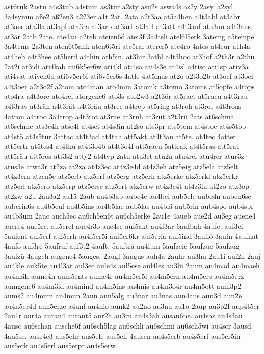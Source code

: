 {ast6ruk
2astu
a4s3tub
a4stum
as3tür
a2sty
asu2s
aswa4s
as2y
2asy.
a2syl
3a4symm
aße2
aß2en3
a2ß3er
a1t
2at.
2ata
a2t3aa
at5a4ben
a4t3abl
at3abr
at3aer
ata3la
at3apf
ata3ra
at3arb
at3art
at3atl
at3att
a4t3auf
ata3un
a4t3aus
at3är
2atb
2ate.
ate4au
a2teb
ateien6d
atei3f
3a4teli
atel6l5erk
3atemg
a5tempe
3a4tems
2a3ten
aten6t5ank
aten6t5ri
ate5ral
aterer5
ate4ro
4ates
at4eur
ath4a
at4heb
a4t3hee
at5herd
a4thin
ath5in.
at3hir
3athl
a4t3hoc
at3hof
a2th3r
a2thü
2at2i
at3idi
ati4kab
ati6k5er6w
ati4kl
ati4sa
ati4s3e
at4isl
a4tiso
ati4sp
ativ3a
ati4vat
ativen6d
ati6v5er6f
ati6v5er6s
4atle
4at5mus
at2o
a2t3o2b
at3oef
at3oel
a4t3oer
a2t3o2f
a2tom
ato4man
ato4min
3atomk
a3tomo
3atoms
at5opfe
a4tops
ato4ra
a4t3orc
ato4rei
atorgene6
ato3s
ato2w3
a2t3ör
at5raet
at5raeu
a4t3rau
a4t3rav
at3rän
a4t3rät
a4t3räu
at3rec
a4trep
at5ring
at3roh
at3rol
a4t3rom
4atron
a4troo
3a4trop
a4t3rot
at3rue
at3ruh
at3rut
a2t3rü
2ats
at6schma
at6schme
ats3e4h
atse4l
at4set
at4s3in
at2so
ats3pr
ats5tem
at4stoe
at4s5top
at4stö
at4s5tur
3attac
at4t3ad
at4tah
att5akt
at4t3au
at5te.
at4tec
4atter
att5ertr
at5tes4
at4thu
at4t3o4b
at4t3o4f
att5raeu
5attrak
at4t5ras
att5rat
att5räu
att5ros
att3s2
atty2
at4typ
2atu
atu3et
atu2n
atu4rei
atu4rer
atur3z
atus3e
atwa3r
at2za
at2zä
at4z3ec
at4z3e4d
at4z3eh
atz5eig
atz5ela
atz5elt
at4z3em
atzen5e
atz5erb
atz5erf
atz5erg
atz5erh
atz5erke
atz5erkl
atz5erkr
atz5erl
atz5ero
atz5erp
atz5ersc
atz5ert
atz5erw
at4z3e4t
at4z3in
at2zo
atz3op
at2zw
a2u
2au3a2
au1ä
2aub
au4b3ab
aube4e
au4bei
aub5ele
aube4n
auben6se
auberin6s
au4b5eul
au4b5ins
au4b5lae
aub5las
au4blä
aub5rin
aub4spo
aub4spr
au4b3um
2auc
auch5ec
au6ch5en6t
au6ch5erke
2au1e
4aueb
aue2d
au3eg
auene4
auere4
aue5re.
au5erel
aue4r3o
aue4sc
auf5akt
au4f3ar
6aufbah
4aufe.
auf3ei
5aufent
auf5erf
auf5erh
au4f5er5i
auf5er6kr
auf5erla
auf5ind
3auflö
3aufn
4aufnat
4aufo
auf3re
5aufruf
auf3t2
4auft.
5aufträ
au4fum
5aufzeic
5aufzue
5aufzug
3aufzü
4augeh
augene4
5auges.
2augl
3augus
auh4a
2auhr
au3hu
2au1i
aui2n
2auj
au4kle
auk5te
au4l3at
aul3ec
aule4s
aul5ese
aul4les
au3lü
2aum
au4mad
au4maeh
au4mäh
aume4n
aum5ents
aume4r
au4m5er5i
au4m5ern
au4m5ers
au4m5erz
aumgene6
au4m3id
au4mind
au4m5ins
au4mis
au4m3o4r
au4m5ott
aum3p2
aums2
au4mum
au4mun
2aun
aun5alg
au3nar
au3nas
aun4aus
aun3d
aun2e
au4n5er4d
aun5erze
a4unf
au4nio
aunk2
au2no
au3nu
au1o
2aup
au3p2f
aup4t5er
2au1r
aur4a
auran4
aurant5
aur2h
au3ru
au4s3ah
ausan6ne.
au4sas
au4s3au
4ausc
au6schan
ausche6f
au6sch5lag
au6schli
au6schmi
au6sch5wi
au4scr
3ausd
4au5se.
ause4e3
aus5ehr
aus5ele
aus5elf
4ausen
au4s5erb
au4s5erf
aus5er5in
aus5erk
au4s5erl
aus5erpr
au4s5erw
}
